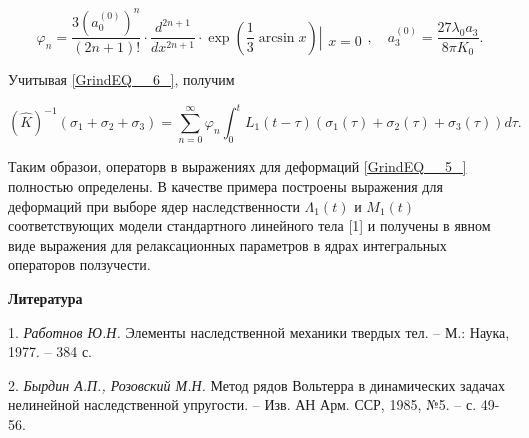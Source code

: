 \[\varphi _{n} =\frac{3(a_{0}^{(0)} )^{n} }{(2n+1)!} \cdot \frac{d^{2n+1} }{dx^{2n+1} } \cdot \exp \left(\frac{1}{3} \arcsin x\right)\left|\begin{array}{l} {} \\ {x=0} \end{array}\right. ,\quad a_{3}^{(0)} =\frac{27\lambda _{0} a_{3} }{8\pi K_{0} } .\]

Учитывая  \eqref{GrindEQ__6_},  получим

\[(\hat{K})^{-1} (\sigma _{1} +\sigma _{2} +\sigma _{3} )=\sum _{n=0}^{\infty }\varphi _{n}  \int _{0}^{t}L_{1}  (t-\tau )(\sigma _{1} (\tau )+\sigma _{2} (\tau )+\sigma _{3} (\tau ))d\tau .\]

Таким образои, операторв в выражениях для деформаций \eqref{GrindEQ__5_} полностью определены. В качестве примера построены выражения для деформаций при выборе ядер наследственности $\Lambda _{1} (t)$ и $M_{1} (t)$ соответствующих модели стандартного линейного тела  [1] и получены в явном виде выражения для релаксационных параметров в ядрах интегральных операторов ползучести.

\smallskip \centerline {\bf Литература} \nopagebreak

1.
{\it Работнов Ю.Н.} Элементы наследственной механики твердых тел. -- М.: Наука, 1977. -- 384 с.

2.
{\it Бырдин А.П., Розовский М.Н.} Метод рядов Вольтерра в динамических задачах  нелинейной наследственной упругости.  -- Изв. АН Арм. ССР, 1985, №5. -- с. 49-56.









